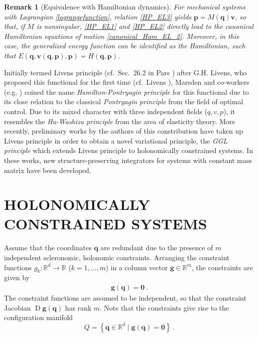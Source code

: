\documentclass{multibody2023_full_paper}
\newtheorem{remark}[theorem]{Remark}
\DeclareMathOperator{\D}{D}
\renewcommand{\vec}[1]{\ensuremath{\mbox{$\mathbf{#1}$}}}
\newcommand{\eqdot}{\ensuremath{\ \text{.}}}
\begin{document}
\begin{remark}[Equivalence with Hamiltonian dynamics]
    For mechanical systems with Lagrangian \eqref{lagrangefunction}, relation \eqref{HP_EL3} yields $\vec{p}=M(\vec{q})\vec{v}$, so that, if $M$ is nonsingular, \eqref{HP_EL1} and \eqref{HP_EL2} directly lead to the canonical Hamiltonian equations of motion \eqref{canonical_Ham_EL_2}. Moreover, in this case, the generalized energy function can be identified as the Hamiltonian, such that $E(\vec{q},\vec{v}(\vec{q},\vec{p}),\vec{p}) = H(\vec{q},\vec{p})$.
\end{remark}

Initially termed Livens principle (cf.\ Sec.\ 26.2 in Pars \cite{pars_treatise_1966}) after G.H. Livens, who proposed this functional for the first time (cf.\ Livens \cite{livens_hamiltons_1919}), Marsden and co-workers (e.g. \cite{bou-rabee_hamiltonpontryagin_2009}) coined the name \textit{Hamilton-Pontryagin principle} for this functional due to its close relation to the classical \textit{Pontryagin principle} from the field of optimal control. Due to its mixed character with three independent fields ($q,v,p$), it resembles the \textit{Hu-Washizu principle} from the area of elasticity theory. More recently, preliminary works \cite{kinon_ggl_2023, kinon_structure_2023} by the authors of this constribution have taken up Livens principle in order to obtain a novel variational principle, the \textit{GGL principle} which extends Livens principle to holonomically constrained systems. In these works, new structure-preserving integrators for systems with constant mass matrix have been developed.

\section{HOLONOMICALLY CONSTRAINED SYSTEMS}\label{sec_constraints}

Assume that the coordinates $\vec{q}$ are redundant due to the presence of $m$ independent scleronomic, holonomic constraints.
Arranging the constraint functions $g_k \colon \mathbb{R}^d \rightarrow \mathbb{R}$ ($k=1,\ldots,m$) in a column vector $\vec{g} \in \mathbb{R}^m$, the constraints are given by
\begin{align} \label{eq:constraints-holonomic}
    \vec{g}(\vec{q}) = \vec{0}  \eqdot
\end{align}
The constraint functions are assumed to be independent, so that the constraint Jacobian $ \D \vec{g}(\vec{q})$ has rank $m$. Note that the constraints give rise to the configuration manifold
\begin{equation}
    Q = \left\{ \vec{q} \in \mathbb{R}^d \;\vert\; \vec{g}(\vec{q})=\vec{0} \right\} \eqdot
\end{equation}
\end{document}
